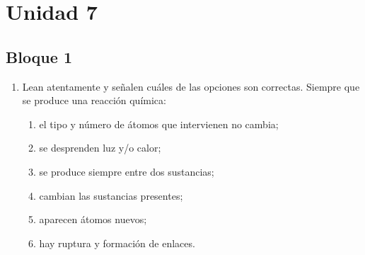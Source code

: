 \documentclass[../practica.root.tex]{subfiles}
\begin{document}
\section{Unidad 7}
\subsection{Bloque 1}
\begin{enumerate}
    \item Lean atentamente y señalen cuáles de las opciones son correctas.
          Siempre que se produce una reacción química:
          \begin{enumerate}
              \item el tipo y número de átomos que intervienen no cambia; \checkmark
              \item se desprenden luz y/o calor;
              \item se produce siempre entre dos sustancias;
              \item cambian las sustancias presentes; \checkmark
              \item aparecen átomos nuevos;
              \item hay ruptura y formación de enlaces. \checkmark
          \end{enumerate}


\end{enumerate}
\end{document}
